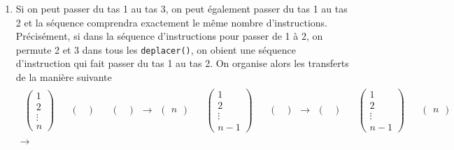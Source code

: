 \begin{enumerate}
\item Si on peut passer du tas 1 au tas 3, on peut également passer du tas 1 au tas 2 et la séquence comprendra exactement le même nombre d'instructions. Précisément, si dans la séquence d'instructions pour passer de 1 à 2, on permute 2 et 3 dans tous les \texttt{deplacer()}, on obient une séquence d'instruction qui fait passer du tas 1 au tas 2.\newline
On organise alors les transferts de la manière suivante
\begin{multline*}
\begin{aligned}
\begin{pmatrix}
1 \\ 2 \\ \vdots \\ n  
\end{pmatrix}
& &
\begin{pmatrix}
 \\ 
\end{pmatrix}
& &
\begin{pmatrix}
 \\
\end{pmatrix}
\end{aligned}
  \longrightarrow 
\begin{aligned}
\begin{pmatrix}
 n  
\end{pmatrix}
& &
\begin{pmatrix}
1 \\ 2 \\ \vdots \\ n-1 
\end{pmatrix}
& &
\begin{pmatrix}
 \\
\end{pmatrix}
\end{aligned}
  \longrightarrow 
\begin{aligned}
\begin{pmatrix}
 \\  
\end{pmatrix}
& &
\begin{pmatrix}
1 \\ 2 \\ \vdots \\ n-1 
\end{pmatrix}
& &
\begin{pmatrix}
 n
\end{pmatrix}
\end{aligned}  \\
  \longrightarrow 

\end{multline*}
\end{enumerate}
